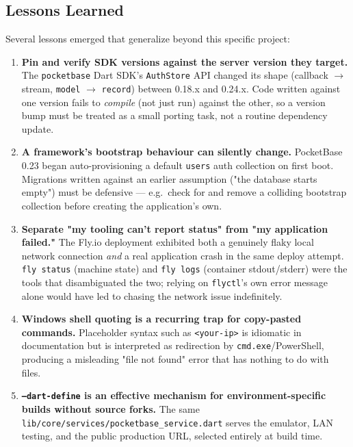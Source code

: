 \documentclass[11pt,a4paper]{article}
\begin{document}
\subsection{Lessons Learned}

Several lessons emerged that generalize beyond this specific project:

\begin{enumerate}[nosep]
  \item \textbf{Pin and verify SDK versions against the server version they
    target.} The \texttt{pocketbase} Dart SDK's \texttt{AuthStore} API changed
    its shape (callback $\rightarrow$ stream, \texttt{model}
    $\rightarrow$ \texttt{record}) between 0.18.x and 0.24.x. Code written
    against one version fails to \textit{compile} (not just run) against the
    other, so a version bump must be treated as a small porting task, not a
    routine dependency update.
  \item \textbf{A framework's bootstrap behaviour can silently change.}
    PocketBase 0.23 began auto-provisioning a default \texttt{users} auth
    collection on first boot. Migrations written against an earlier
    assumption ("the database starts empty") must be defensive --- e.g.\
    check for and remove a colliding bootstrap collection before creating
    the application's own.
  \item \textbf{Separate "my tooling can't report status" from "my
    application failed."} The Fly.io deployment exhibited both a genuinely
    flaky local network connection \textit{and} a real application crash in
    the same deploy attempt. \texttt{fly status} (machine state) and
    \texttt{fly logs} (container stdout/stderr) were the tools that
    disambiguated the two; relying on \texttt{flyctl}'s own error message
    alone would have led to chasing the network issue indefinitely.
  \item \textbf{Windows shell quoting is a recurring trap for
    copy-pasted commands.} Placeholder syntax such as
    \texttt{<your-ip>} is idiomatic in documentation but is interpreted as
    redirection by \texttt{cmd.exe}/PowerShell, producing a misleading "file
    not found" error that has nothing to do with files.
  \item \textbf{\texttt{--dart-define} is an effective mechanism for
    environment-specific builds without source forks.} The same
    \texttt{lib/core/services/pocketbase\_service.dart} serves the emulator,
    LAN testing, and the public production URL, selected entirely at build
    time.
\end{enumerate}
\end{document}
